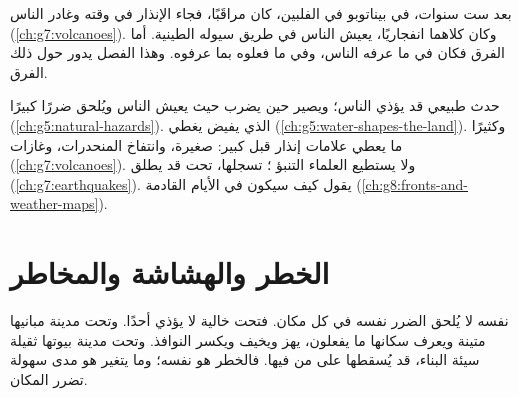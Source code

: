 بعد ست سنوات، في  بيناتوبو في الفلبين، كان  مراقَبًا، فجاء الإنذار في
وقته وغادر الناس (\cref{ch:g7:volcanoes}). وكان كلاهما  انفجاريًا، يعيش
الناس في طريق سيوله الطينية. أما الفرق فكان في ما عرفه الناس، وفي ما فعلوه بما
عرفوه. وهذا الفصل يدور حول ذلك
الفرق.

\begin{recall}
\emph{} حدث طبيعي قد يؤذي الناس؛ ويصير \emph{} حين يضرب
حيث يعيش الناس ويُلحق ضررًا كبيرًا (\cref{ch:g5:natural-hazards}).  الذي
يفيض يغطي  (\cref{ch:g5:water-shapes-the-land}). وكثيرًا ما يعطي
 علامات إنذار قبل  كبير:  صغيرة، وانتفاخ المنحدرات، وغازات
(\cref{ch:g7:volcanoes}). ولا يستطيع العلماء التنبؤ ؛ 
تسجلها،  تحت  قد يطلق  (\cref{ch:g7:earthquakes}).  يقول كيف سيكون  في الأيام القادمة
(\cref{ch:g8:fronts-and-weather-maps}).
\end{recall}

\section{الخطر والهشاشة والمخاطر}

 نفسه لا يُلحق الضرر نفسه في كل مكان. فتحت  خالية لا يؤذي أحدًا.
وتحت مدينة مبانيها متينة ويعرف سكانها ما يفعلون، يهز ويخيف ويكسر النوافذ. وتحت
مدينة بيوتها ثقيلة سيئة البناء، قد يُسقطها على من فيها. فالخطر هو نفسه؛ وما
يتغير هو مدى سهولة تضرر المكان.

